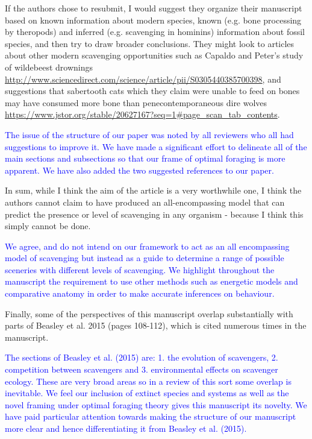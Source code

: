 \documentclass[12pt,letterpaper]{article}
\begin{document}


\bigskip

If the authors chose to resubmit, I would suggest they organize their manuscript based on known information about modern species, known (e.g. bone processing by theropods) and inferred (e.g. scavenging in hominins) information about fossil species, and then try to draw broader conclusions.
They might look to articles about other modern scavenging opportunities such as Capaldo and Peter's study of wildebeest drownings \url{http://www.sciencedirect.com/science/article/pii/S0305440385700398}, and suggestions that sabertooth cats which they claim were unable to feed on bones may have consumed more bone than penecontemporaneous dire wolves \url{https://www.jstor.org/stable/20627167?seq=1#page_scan_tab_contents}. 

\bigskip

\textcolor{blue}{The issue of the structure of our paper was noted by all reviewers who all had suggestions to improve it. 
We have made a significant effort to delineate all of the main sections and subsections so that our frame of optimal foraging is more apparent.
We have also added the two suggested references to our paper.}

\bigskip
In sum, while I think the aim of the article is a very worthwhile one, I think the authors cannot claim to have produced an all-encompassing model that can predict the presence or level of scavenging in any organism - because I think this simply cannot be done.

\textcolor{blue}{We agree, and do not intend on our framework to act as an all encompassing model of scavenging but instead as a guide to determine a range of possible sceneries with different levels of scavenging. We highlight throughout the manuscript the requirement to use other methods such as energetic models and comparative anatomy in order to make accurate inferences on behaviour.}


Finally, some of the perspectives of this manuscript overlap substantially with parts of Beasley et al. 2015 (pages 108-112), which is cited numerous times in the manuscript.
\bigskip

\textcolor{blue}{The sections of Beasley et al. (2015) are: 1. the evolution of scavengers, 2. competition between scavengers and 3. environmental effects on scavenger ecology.
These are very broad areas so in a review of this sort some overlap is inevitable.
We feel our inclusion of extinct species and systems as well as the novel framing under optimal foraging theory gives this manuscript its novelty. We have paid particular attention towards making the structure of our manuscript more clear and hence differentiating it from Beasley et al. (2015).}
\bigskip
\end{document}

